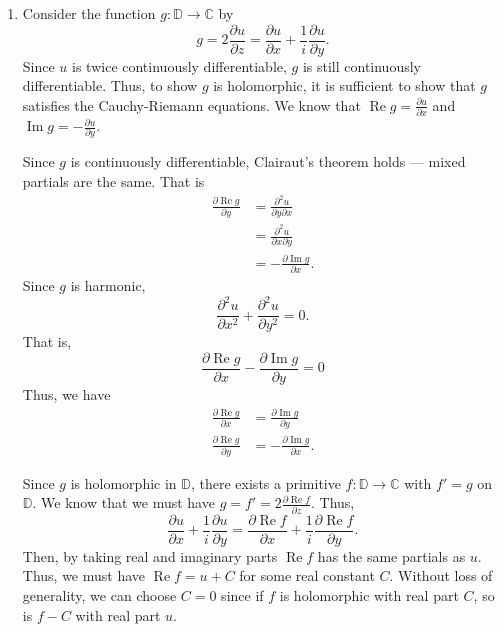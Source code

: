 \documentclass[12 pt, letterpaper]{hmcpset}
\begin{document}
\begin{solution}
	\begin{enumerate}
		\item Consider the function $g : \mathbb{D} \to \mathbb{C}$ by
			\[
				g = 2 \frac{\partial u}{\partial z} = \frac{\partial u}{\partial x} + \frac{1}{i} \frac{\partial u}{\partial y}.
			\]
			Since $u$ is twice continuously differentiable, $g$ is still continuously differentiable. Thus, to show $g$ is holomorphic, it is sufficient to show that $g$ satisfies the Cauchy-Riemann equations. We know that $\operatorname{Re} g = \frac{\partial u}{\partial x}$ and $\operatorname{Im} g = - \frac{\partial u}{\partial y}$.

			Since $g$ is continuously differentiable, Clairaut's theorem holds --- mixed partials are the same. That is
			\[
				\begin{split}
					\frac{\partial \operatorname{Re} g}{\partial y} & = \frac{\partial^{2} u}{\partial y \partial x} \\
											& = \frac{\partial^{2} u}{\partial x \partial y} \\
											& = - \frac{\partial \operatorname{Im} g}{\partial x}.
				\end{split}
			\]
			Since $g$ is harmonic,
			\[
				\frac{\partial^{2} u}{\partial x^{2}} + \frac{\partial^{2} u}{\partial y^{2}} = 0.
			\]
			That is,
			\[
				\frac{\partial \operatorname{Re} g}{\partial x} - \frac{\partial \operatorname{Im} g}{\partial y} = 0
			\]
			Thus, we have
			\[
				\begin{split}
					\frac{\partial \operatorname{Re} g}{\partial x} & = \frac{\partial \operatorname{Im} g}{\partial y} \\
					\frac{\partial \operatorname{Re} g}{\partial y} & = - \frac{\partial \operatorname{Im} g}{\partial x}.
				\end{split}
			\]

			Since $g$ is holomorphic in $\mathbb{D}$, there exists a primitive $f : \mathbb{D} \to \mathbb{C}$ with $f' = g$ on $\mathbb{D}$. We know that we must have $g = f' = 2 \frac{\partial \operatorname{Re} f}{\partial z}$. Thus,
			\[
				\frac{\partial u}{\partial x} + \frac{1}{i} \frac{\partial u}{\partial y} = \frac{\partial \operatorname{Re} f}{\partial x} + \frac{1}{i} \frac{\partial \operatorname{Re} f}{\partial y}.
			\]
			Then, by taking real and imaginary parts $\operatorname{Re} f$ has the same partials as $u$. Thus, we must have $\operatorname{Re} f = u + C$  for some real constant $C$. Without loss of generality, we can choose $C = 0$ since if $f$ is holomorphic with real part $C$, so is $f - C$ with real part $u$.


\end{enumerate}
\end{solution}
\end{document}
